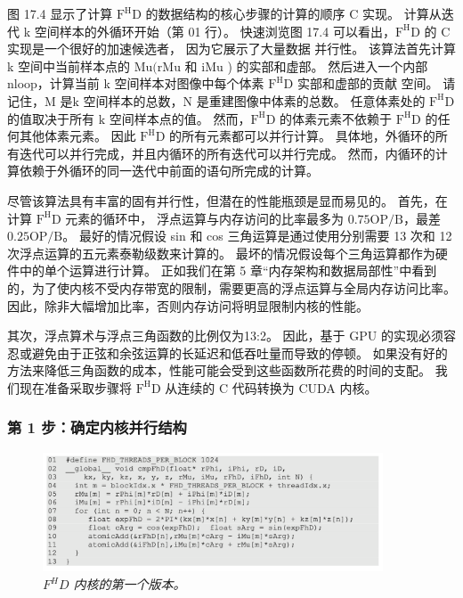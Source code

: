 图 17.4 显示了计算 $\mathrm{F}^{\mathrm{H}} \mathrm{D}$ 的数据结构的核心步骤的计算的顺序 $\mathrm{C}$ 实现。 
计算从迭代 k 空间样本的外循环开始（第 01 行）。 
快速浏览图 17.4 可以看出，$\mathrm{F}^{\mathrm{H}} \mathrm{D}$ 的 $\mathrm{C}$ 实现是一个很好的加速候选者，
因为它展示了大量数据 并行性。 
该算法首先计算 k 空间中当前样本点的 $\mathrm{Mu}(\mathrm{rMu}$ 和 $\mathrm{iMu}$ ) 的实部和虚部。 
然后进入一个内部 nloop，计算当前 k 空间样本对图像中每个体素 $\mathrm{F}^{\mathrm{H}} \mathrm{D}$ 实部和虚部的贡献 空间。 
请记住，$\mathrm{M}$ 是$\mathrm{k}$ 空间样本的总数，$\mathrm{N}$ 是重建图像中体素的总数。 
任意体素处的 $\mathrm{F}^{\mathrm{H}} \mathrm{D}$ 的值取决于所有 $\mathrm{k}$ 空间样本点的值。 
然而，$\mathrm{F}^{\mathrm{H}} \mathrm{D}$ 的体素元素不依赖于 
$\mathrm{F}^{\mathrm{H}} \mathrm{D}$ 的任何其他体素元素。 
因此 $\mathrm{F}^{\mathrm{H}} \mathrm{D}$ 的所有元素都可以并行计算。 
具体地，外循环的所有迭代可以并行完成，并且内循环的所有迭代可以并行完成。 
然而，内循环的计算依赖于外循环的同一迭代中前面的语句所完成的计算。

尽管该算法具有丰富的固有并行性，但潜在的性能瓶颈是显而易见的。 
首先，在计算 $\mathrm{F}^{\mathrm{H}} \mathrm{D}$ 元素的循环中，
浮点运算与内存访问的比率最多为 $0.75 \mathrm{OP} / \mathrm{B}$，最差 $0.25 \mathrm{OP} / \mathrm{B}$。 
最好的情况假设 sin 和 cos 三角运算是通过使用分别需要 13 次和 12 次浮点运算的五元素泰勒级数来计算的。 
最坏的情况假设每个三角运算都作为硬件中的单个运算进行计算。 
正如我们在第 5 章“内存架构和数据局部性”中看到的，为了使内核不受内存带宽的限制，需要更高的浮点运算与全局内存访问比率。 
因此，除非大幅增加比率，否则内存访问将明显限制内核的性能。

其次，浮点算术与浮点三角函数的比例仅为13:2。 
因此，基于 GPU 的实现必须容忍或避免由于正弦和余弦运算的长延迟和低吞吐量而导致的停顿。 
如果没有好的方法来降低三角函数的成本，性能可能会受到这些函数所花费的时间的支配。 
我们现在准备采取步骤将 $\mathrm{F}^{\mathrm{H}} \mathrm{D}$ 从连续的 $\mathrm{C}$ 代码转换为 CUDA 内核。

\subsubsection{第 1 步：确定内核并行结构}
\begin{figure}[H]
	\centering
	\includegraphics[width=0.9\textwidth]{figs/F17.5.png}
	\caption{\textit{$F^H D$ 内核的第一个版本。}}
\end{figure}

